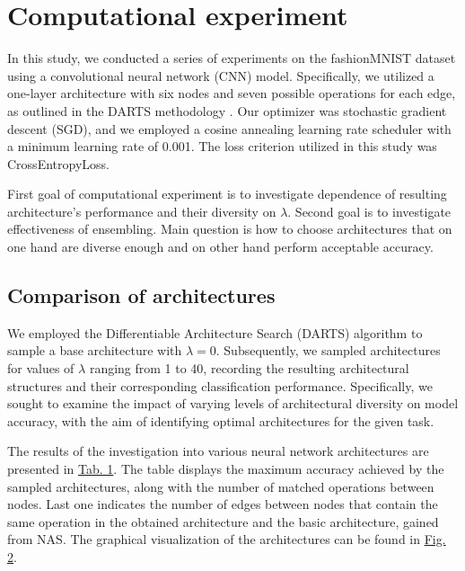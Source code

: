 \documentclass{article}
\begin{document}
\section{Computational experiment}

In this study, we conducted a series of experiments on the fashionMNIST dataset \citep{xiao2017fashion} using a convolutional neural network (CNN) model.
Specifically, we utilized a one-layer architecture with six nodes and seven possible operations for each edge, as outlined in the DARTS methodology \cite{darts}.
Our optimizer was stochastic gradient descent (SGD), and we employed a cosine annealing learning rate scheduler with a minimum learning rate of 0.001. The loss criterion utilized in this study was CrossEntropyLoss.

First goal of computational experiment is to investigate dependence of resulting architecture's performance and their diversity on $\lambda$.
Second goal is to investigate effectiveness of ensembling.
Main question is how to choose architectures that on one hand are diverse enough and on other hand perform acceptable accuracy.

\subsection{Comparison of architectures}

We employed the Differentiable Architecture Search (DARTS) algorithm to sample a base architecture with $\lambda = 0$. Subsequently, we sampled architectures for values of $\lambda$ ranging from 1 to 40, recording the resulting architectural structures and their corresponding classification performance. Specifically, we sought to examine the impact of varying levels of architectural diversity on model accuracy, with the aim of identifying optimal architectures for the given task. 

The results of the investigation into various neural network architectures are presented in \hyperref[tab:prelim]{Tab. 1}.
The table displays the maximum accuracy achieved by the sampled architectures, along with the number of matched operations between nodes.
Last one indicates the number of edges between nodes that contain the same operation in the obtained architecture and the basic architecture, gained from NAS.
The graphical visualization of the architectures can be found in \hyperref[fig:graph1]{Fig. 2}.
\end{document}
